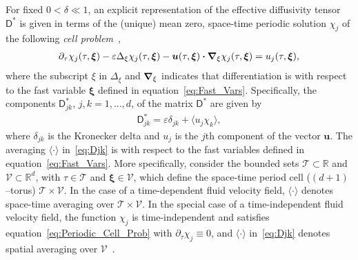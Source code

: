 \documentclass[leqno,onefignum,onetabnum]{siamltex1213}
\newcommand{\Tc}{\mathcal{T}}
\newcommand{\Vc}{\mathcal{V}}
\newcommand{\Dm}{\mathsf{D}}
\newcommand\bnabla{\mbox{\boldmath${\nabla}$}}
\providecommand\bcdot{\boldsymbol{\cdot}}
\newcommand{\vecu}{\boldsymbol{u}}
\newcommand{\vecxi}{\boldsymbol{\xi}}
\begin{document}
For fixed $0<\delta\ll1$, an explicit representation of the
effective diffusivity tensor $\Dm^*$ is given in terms of the (unique)
mean zero, space-time periodic solution $\chi_j$ of the following
\emph{cell problem}~\cite{Biferale:PF:2725,Majda:Kramer:1999:book}, 
%
\begin{align}\label{eq:Periodic_Cell_Prob}
  \partial_\tau\chi_j(\tau,\vecxi)
  -\varepsilon\Delta_\xi\chi_j(\tau,\vecxi)
  -\vecu(\tau,\vecxi) \bcdot\bnabla_\xi \chi_j(\tau,\vecxi)
  =u_j(\tau,\vecxi),
\end{align}
%
where the subscript $\xi$ in $\Delta_\xi$ and $\bnabla_\xi$
indicates that differentiation is with respect to the fast variable
$\vecxi$ defined in equation~\eqref{eq:Fast_Vars}. Specifically,
the components $\Dm^*_{jk}$, $j,k=1,\ldots,d$, of the matrix $\Dm^*$ are given
by~\cite{McLaughlin:SIAM_JAM:780,Fannjiang:1994:SIAM_JAM:333,Majda:Kramer:1999:book}          
%
\begin{align}\label{eq:Djk}
  \Dm^*_{jk}=\varepsilon\delta_{jk}+\langle u_j\chi_k\rangle,
\end{align}
%
where $\delta_{jk}$ is the Kronecker delta and $u_j$ is the $j$th component
of the vector $\vecu$. The averaging $\langle\cdot\rangle$ in~\eqref{eq:Djk} is with
respect to the fast variables defined in
equation~\eqref{eq:Fast_Vars}. More specifically, consider the bounded
sets  $\Tc\subset\mathbb{R}$ and $\Vc\subset\mathbb{R}^d$, with $\tau\in\Tc$ and
$\vecxi\in\Vc$, which define the space-time period cell ($(d+1)$--torus)
$\Tc\times\Vc$. In the case of a time-dependent fluid velocity field, $\langle\cdot\rangle$
denotes space-time averaging over $\Tc\times\Vc$. In the special case of a
time-independent fluid velocity field, the function $\chi_j$ is
time-independent and satisfies equation~\eqref{eq:Periodic_Cell_Prob}
with $\partial_\tau\chi_j\equiv0$, and $\langle\cdot\rangle$ in~\eqref{eq:Djk} denotes spatial averaging over
$\Vc$~\cite{Fannjiang:1994:SIAM_JAM:333,Majda:Kramer:1999:book}.
\end{document}
